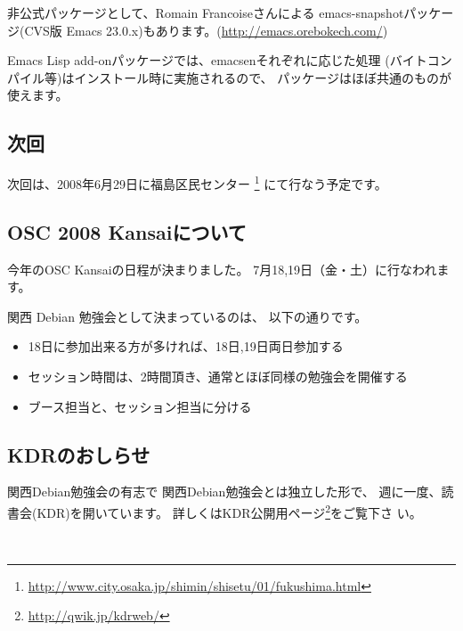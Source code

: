 \documentclass[mingoth,a4paper]{jsarticle}
\begin{document}
非公式パッケージとして、Romain Francoiseさんによる
emacs-snapshotパッケージ(CVS版 Emacs 23.0.x)もあります。(\url{http://emacs.orebokech.com/})

Emacs Lisp add-onパッケージでは、emacsenそれぞれに応じた処理
(バイトコンパイル等)はインストール時に実施されるので、
パッケージはほぼ共通のものが使えます。


\subsection{次回}
次回は、2008年6月29日に福島区民センター
\footnote{\url{http://www.city.osaka.jp/shimin/shisetu/01/fukushima.html}}
にて行なう予定です。

\subsection{OSC 2008 Kansaiについて}
今年のOSC Kansaiの日程が決まりました。
7月18,19日（金・土）に行なわれます。

関西 Debian 勉強会として決まっているのは、
以下の通りです。

\begin{itemize}
 \item 18日に参加出来る方が多ければ、18日,19日両日参加する
 \item セッション時間は、2時間頂き、通常とほぼ同様の勉強会を開催する
 \item ブース担当と、セッション担当に分ける
\end{itemize}

\subsection{KDRのおしらせ}
関西Debian勉強会の有志で
関西Debian勉強会とは独立した形で、
週に一度、読書会(KDR)を開いています。
詳しくはKDR公開用ページ\footnote{\url{http://qwik.jp/kdrweb/}}をご覧下さ
い。

　
\printindex
 \cleartooddpage
\end{document}
